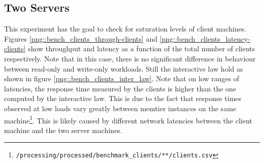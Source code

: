 \documentclass[11pt,a4paper]{article}
\begin{document}
\subsection{Two Servers}
This experiment has the goal to check for saturation levels of client machines. Figures \ref{png::bench_clients_through-clients} and \ref{png::bench_clients_latency-clients} show throughput and latency as a function of the total number of clients respectively. Note that in this case, there is no significant difference in behaviour between read-only and write-only workloads. Still the interactive law hold as shown in figure \ref{png::bench_clients_inter_law}. Note that on low ranges of latencies, the response time measured by the clients is higher than the one computed by the interactive law. This is due to the fact that response times observed at low loads vary greatly between memtier instances on the same machine\footnote{\texttt{/processing/processed/benchmark_clients/**/clients.csv}}. This is likely caused by different network latencies between the client machine and the two server machines.
\end{document}
